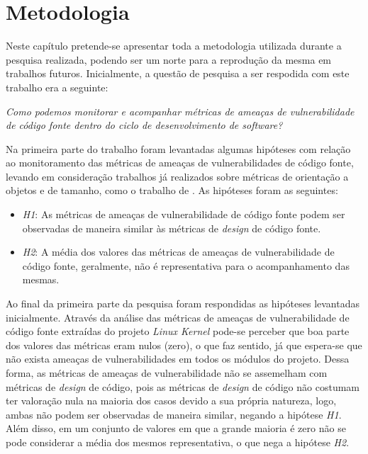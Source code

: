 \chapter{Metodologia}\label{metodologia}

Neste capítulo pretende-se apresentar toda a metodologia utilizada durante a
pesquisa realizada, podendo ser um norte para a reprodução da mesma em trabalhos
futuros. Inicialmente, a questão de pesquisa a ser respodida com este trabalho era a
seguinte:

\begin{center}
  \textit{Como podemos monitorar e acompanhar métricas de ameaças de
    vulnerabilidade de código fonte dentro do ciclo de desenvolvimento de
    software?
}
\end{center}

Na primeira parte do trabalho foram levantadas algumas hipóteses com relação ao
monitoramento das métricas de ameaças de vulnerabilidades de código fonte,
levando em consideração trabalhos já realizados sobre métricas de orientação a
objetos e de tamanho, como o trabalho de . As hipóteses
foram as seguintes:

\begin{itemize}
  \item \textit{H1}: As métricas de ameaças de vulnerabilidade de código fonte
  podem ser observadas de maneira similar às métricas de \textit{design} de código
  fonte.

  \item \textit{H2}: A média dos valores das métricas de ameaças de vulnerabilidade de
  código fonte, geralmente, não é representativa para o acompanhamento das mesmas.

\end{itemize}

Ao final da primeira parte da pesquisa foram respondidas as hipóteses levantadas
inicialmente. Através da análise das métricas de ameaças de vulnerabilidade de
código fonte extraídas do projeto \textit{Linux Kernel} pode-se perceber que boa
parte dos valores das métricas eram nulos (zero), o que faz sentido, já que
espera-se que não exista ameaças de vulnerabilidades em todos os módulos do
projeto. Dessa forma, as métricas de ameaças de vulnerabilidade não se
assemelham com métricas de \textit{design} de código, pois as métricas de
\textit{design} de código não costumam ter valoração nula na maioria dos casos
devido a sua própria natureza, logo, ambas não podem ser observadas de maneira
similar, negando a hipótese \textit{H1}. Além disso, em um conjunto de valores
em que a grande maioria é zero não se pode considerar a média dos mesmos
representativa, o que nega a hipótese \textit{H2}.

